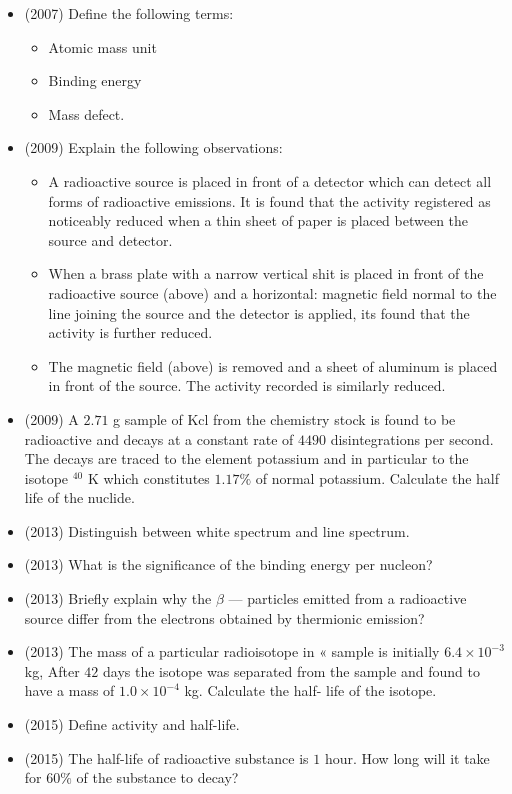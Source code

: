\documentclass{article}
\begin{document}
\begin{itemize}
\item (2007)  Define the following terms:
 \begin{itemize}
\item Atomic mass unit
\item Binding energy
\item Mass defect.
\end{itemize}
\item (2009)  Explain the following observations:
 \begin{itemize}
\item A radioactive source is placed in front of a detector which can detect all forms of radioactive emissions. It is found that the activity registered as noticeably reduced when a thin sheet of paper is placed between the source and detector.
\item When a brass plate with a narrow vertical shit is placed in front of the radioactive source (above) and a horizontal: magnetic field normal to the line joining the source and the detector is applied, its found that the activity is further reduced.
\item The magnetic field (above) is removed and a sheet of aluminum is placed in front of the source. The activity recorded is similarly reduced.
\end{itemize}
\item (2009)  A $ 2.71$ g sample of Kcl from the chemistry stock is found to be radioactive and decays at a constant rate of $ 4490$ disintegrations per second.  The decays are traced to the element potassium and in particular to the isotope $ ^{40}$ K which constitutes $ 1.17\%$ of normal potassium.  Calculate the half life of the nuclide.
\item (2013)  Distinguish between white spectrum and line spectrum. 
\item (2013)  What is the significance of the binding energy per nucleon? 
\item (2013)  Briefly explain why the $ \beta$  — particles emitted from a radioactive source differ from the electrons obtained by thermionic emission? 
\item (2013)  The mass of a particular radioisotope in « sample is initially $ 6.4 \times 10^{-3}$ kg, After $ 42$ days the isotope was separated from the sample and found to have a mass of $ 1.0 \times 10^{-4}$ kg. Calculate the half- life of the isotope.
\item (2015)  Define activity and half-life.
\item (2015)  The half-life of radioactive substance is $ 1$ hour.  How long will it take for $ 60\%$ of the substance to decay?

\end{itemize}
\end{document}
